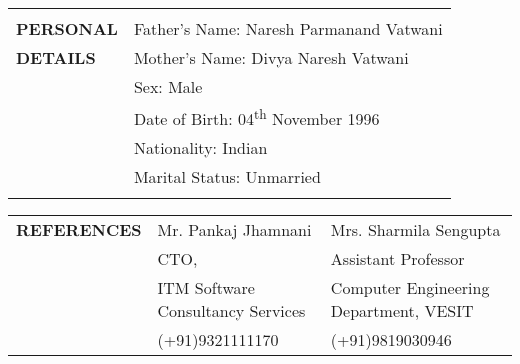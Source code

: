 \documentclass[letterpaper,11pt,oneside]{article}
\begin{document}
\begin{tabular}{@{} l l}
		& \\
		\textbf{PERSONAL}    & \hspace{0.1cm}Father's Name: Naresh Parmanand Vatwani\\
		\textbf{DETAILS}    & \hspace{0.1cm}Mother's Name: Divya Naresh Vatwani \\
		&\hspace{0.1cm}Sex: Male\\
		&\hspace{0.1cm}Date of Birth: 04\textsuperscript{th} November 1996\\
		&\hspace{0.1cm}Nationality: Indian\\
		& \hspace{0.1cm}Marital Status: Unmarried\\
		\\
		
	\end{tabular}
		\noindent \begin{tabular}{@{} l l l}
			\textbf{REFERENCES} &\hspace{0.3cm}Mr. Pankaj Jhamnani & Mrs. Sharmila Sengupta \\
			& \hspace{0.3cm}CTO, &  Assistant Professor \\
			&\hspace{0.3cm}ITM Software Consultancy Services &  Computer Engineering Department, VESIT \\
			&\hspace{0.3cm}(+91)9321111170 & (+91)9819030946\\
			
			
		\end{tabular}
\end{document}
